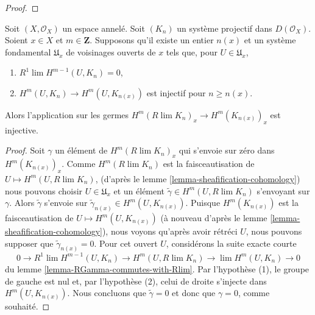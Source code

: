 {\begin{proof}
\end{proof}

\begin{lemma}

\label{lemma-cohomology-derived-limit-injective}

Soit $(X, \mathcal{O}_X)$ un espace annelé. Soit $(K_n)$ un système projectif dans $D(\mathcal{O}_X)$. Soient $x \in X$ et $m \in \mathbf{Z}$. Supposons qu'il existe un entier $n(x)$ et un système fondamental $\mathfrak{U}_x$
de voisinages ouverts de $x$ tels que, pour $U \in \mathfrak{U}_x$,

\begin{enumerate}

\item  $R^1\lim H^{m - 1}(U, K_n) = 0$,
\item  $H^m(U, K_n) \to H^m(U, K_{n(x)})$ est injectif pour $n \geq n(x)$.

\end{enumerate}

Alors l'application sur les germes $H^m(R\lim K_n)_x \to H^m(K_{n(x)})_x$ est injective.

\end{lemma}

\begin{proof}

Soit $\gamma$ un élément de $H^m(R\lim K_n)_x$ qui s'envoie sur zéro dans $H^m(K_{n(x)})_x$. Comme $H^m(R\lim K_n)$ est la faisceautisation de $U \mapsto H^m(U, R\lim K_n)$,
(d'après le lemme \ref{lemma-sheafification-cohomology}) nous pouvons choisir $U \in \mathfrak{U}_x$
et un élément $\tilde \gamma \in H^m(U, R\lim K_n)$ s'envoyant sur $\gamma$. Alors $\tilde\gamma$ s'envoie sur $\tilde\gamma_{n(x)} \in H^m(U, K_{n(x)})$. Puisque $H^m(K_{n(x)})$ est la faisceautisation de
$U \mapsto H^m(U, K_{n(x)})$
(à nouveau d'après le lemme \ref{lemma-sheafification-cohomology}), nous voyons qu'après avoir rétréci $U$, nous pouvons supposer que $\tilde\gamma_{n(x)} = 0$. Pour cet ouvert $U$, considérons la suite exacte courte
$$
0 \to
R^1\lim H^{m - 1}(U, K_n) \to H^m(U, R\lim K_n) \to
\lim H^m(U, K_n) \to 0
$$
du lemme \ref{lemma-RGamma-commutes-with-Rlim}. Par l'hypothèse (1), le groupe de gauche est nul et, par l'hypothèse (2), celui de droite s'injecte dans $H^m(U, K_{n(x)})$. Nous concluons que $\tilde\gamma = 0$
et donc que $\gamma = 0$, comme souhaité.

\end{proof}

\begin{lemma}


\end{lemma}}
